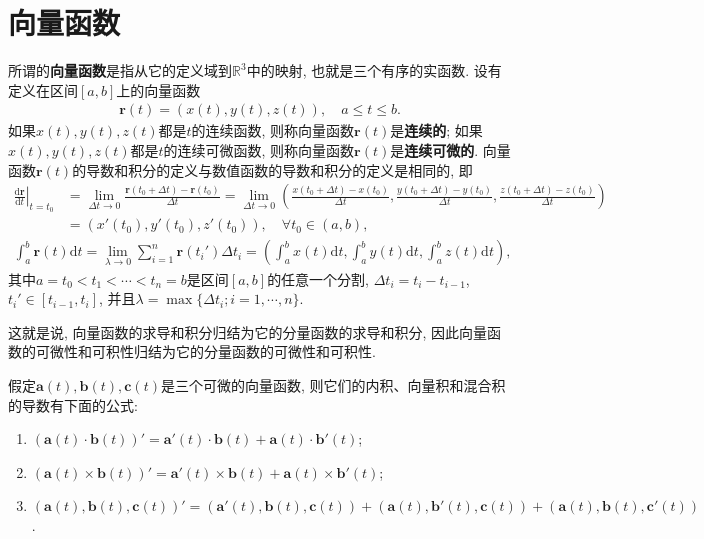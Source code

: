 \documentclass[../../main.tex]{subfiles}%
\begin{document}
\section{向量函数}

\begin{definition}
所谓的\textbf{向量函数}是指从它的定义域到$\mathbb{R}^3$中的映射, 也就是三个有序的实函数. 设有定义在区间$[a,b]$上的向量函数
\begin{align*}
\bm{r}(t) = (x(t), y(t), z(t)),\quad a\leqslant t\leqslant b.
\end{align*}
如果$x(t), y(t), z(t)$都是$t$的连续函数, 则称向量函数$\bm{r}(t)$是\textbf{连续的}; 如果$x(t), y(t), z(t)$都是$t$的连续可微函数, 则称向量函数$\bm{r}(t)$是\textbf{连续可微的}. 向量函数$\bm{r}(t)$的导数和积分的定义与数值函数的导数和积分的定义是相同的, 即
\begin{align*}
\left. \frac{\mathrm{d}\boldsymbol{r}}{\mathrm{d}t} \right|_{t=t_0}&=\lim_{\Delta t\rightarrow 0} \frac{\boldsymbol{r}(t_0+\Delta t)-\boldsymbol{r}(t_0)}{\Delta t}=\lim_{\Delta t\rightarrow 0} \left( \frac{x(t_0+\Delta t)-x(t_0)}{\Delta t},\frac{y(t_0+\Delta t)-y(t_0)}{\Delta t}, \right. \left. \frac{z(t_0+\Delta t)-z(t_0)}{\Delta t} \right) 
\\
&=(x\prime (t_0),y\prime (t_0),z\prime (t_0)),\quad \forall t_0\in (a,b),
\end{align*}
\begin{align*}
\int_a^b{\boldsymbol{r}(t)\mathrm{d}t=\lim_{\lambda \rightarrow 0} \sum_{i=1}^n{\boldsymbol{r}(t_i\prime )\Delta t_i=\left( \int_a^b{x(t)\mathrm{d}t,\int_a^b{y(t)\mathrm{d}t,\int_a^b{z(t)\mathrm{d}t}}} \right) }},
\end{align*}
其中$a = t_0 < t_1 < \cdots < t_n = b$是区间$[a,b]$的任意一个分割, $\Delta t_i = t_i - t_{i-1}$, $t_i'\in[t_{i-1},t_i]$, 并且$\lambda = \max\{\Delta t_i; i=1,\cdots,n\}$. 
\end{definition}
\begin{remark}
这就是说, 向量函数的求导和积分归结为它的分量函数的求导和积分, 因此向量函数的可微性和可积性归结为它的分量函数的可微性和可积性.
\end{remark}

\begin{theorem}
假定$\bm{a}(t),\bm{b}(t),\bm{c}(t)$是三个可微的向量函数, 则它们的内积、向量积和混合积的导数有下面的公式:
\begin{enumerate}[(1)]
\item $(\bm{a}(t)\cdot\bm{b}(t))' = \bm{a}'(t)\cdot\bm{b}(t) + \bm{a}(t)\cdot\bm{b}'(t)$;
\item $(\bm{a}(t)\times\bm{b}(t))' = \bm{a}'(t)\times\bm{b}(t) + \bm{a}(t)\times\bm{b}'(t)$;
\item $(\bm{a}(t),\bm{b}(t),\bm{c}(t))' = (\bm{a}'(t),\bm{b}(t),\bm{c}(t)) + (\bm{a}(t),\bm{b}'(t),\bm{c}(t)) + (\bm{a}(t),\bm{b}(t),\bm{c}'(t))$.
\end{enumerate}
\end{theorem}
\end{document}
